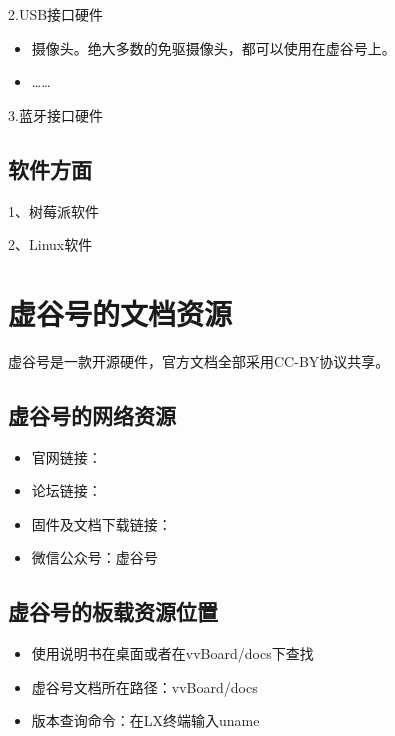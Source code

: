 \documentclass[letterpaper,10pt,english]{sphinxmanual}
\begin{document}
2.USB接口硬件
\begin{itemize}
\item {} 
摄像头。绝大多数的免驱摄像头，都可以使用在虚谷号上。

\item {} 
……

\end{itemize}

3.蓝牙接口硬件


\subsection{软件方面}
\label{\detokenize{01.about/1.4-ecology:id3}}
1、树莓派软件

2、Linux软件


\section{虚谷号的文档资源}
\label{\detokenize{01.about/1.5-docs:id1}}\label{\detokenize{01.about/1.5-docs::doc}}
虚谷号是一款开源硬件，官方文档全部采用CC-BY协议共享。


\subsection{虚谷号的网络资源}
\label{\detokenize{01.about/1.5-docs:id2}}\begin{itemize}
\item {} 
官网链接：

\item {} 
论坛链接：

\item {} 
固件及文档下载链接：

\item {} 
微信公众号：虚谷号

\end{itemize}


\subsection{虚谷号的板载资源位置}
\label{\detokenize{01.about/1.5-docs:id3}}\begin{itemize}
\item {} 
使用说明书在桌面或者在vvBoard/docs下查找

\item {} 
虚谷号文档所在路径：vvBoard/docs

\item {} 
版本查询命令：在LX终端输入uname

\end{itemize}
\end{document}
